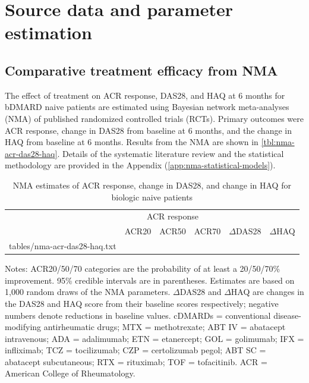 \documentclass[11pt,final,fleqn]{article}\usepackage[]{graphicx}\usepackage[]{color}
\makeatletter
\theoremstyle{plain}
\newcommand*\ExpandableInput[1]{\@@input#1 }
\makeatother
\begin{document}
\section{Source data and parameter estimation}\label{sec:data-parameters}

\subsection{Comparative treatment efficacy from NMA}\label{nma-parameters}
The effect of treatment on ACR response, DAS28, and HAQ at 6 months for bDMARD naive patients are estimated using Bayesian network meta-analyses (NMA) of published randomized controlled trials (RCTs). Primary outcomes were ACR response, change in DAS28 from baseline at 6 months, and the change in HAQ from baseline at 6 months. Results from the NMA are shown in \autoref{tbl:nma-acr-das28-haq}. Details of the systematic literature review and the statistical methodology are provided in the Appendix (\autoref{app:nma-statistical-models}).



\begin{table}
\begin{center}
\begin{threeparttable}
\caption{NMA estimates of ACR response, change in DAS28, and change in HAQ for biologic naive patients} \label{tbl:nma-acr-das28-haq}
\small
\begin{tabular}{lccccc}
\hline
\multicolumn{1}{c}{} & \multicolumn{3}{c}{ACR response} & \multicolumn{2}{c}{}\\
\cmidrule(lr){2-4} 
\multicolumn{1}{l}{} & \multicolumn{1}{c}{ACR20} & \multicolumn{1}{c}{ACR50} & \multicolumn{1}{c}{ACR70} & \multicolumn{1}{c}{$\Delta$DAS28} & \multicolumn{1}{c}{$\Delta$HAQ} \\
\hline
\ExpandableInput{tables/nma-acr-das28-haq.txt}
\hline
\end{tabular}
\scriptsize
Notes: ACR20/50/70 categories are the probability of at least a 20/50/70\% improvement. 95\% credible intervals are in parentheses. Estimates are based on 1,000 random draws of the NMA parameters. $\Delta$DAS28 and $\Delta$HAQ are changes in the DAS28 and HAQ score from their baseline scores respectively; negative numbers denote reductions in baseline values. cDMARDs = conventional disease-modifying antirheumatic drugs; MTX = methotrexate; ABT IV = abatacept intravenous; ADA = adalimumab; ETN = etanercept; GOL = golimumab; IFX = infliximab; TCZ = tocilizumab; CZP = certolizumab pegol; ABT SC = abatacept subcutaneous; RTX = rituximab; TOF = tofacitinib. ACR = American College of Rheumatology.
\end{threeparttable}
\end{center}
\end{table}
\end{document}
